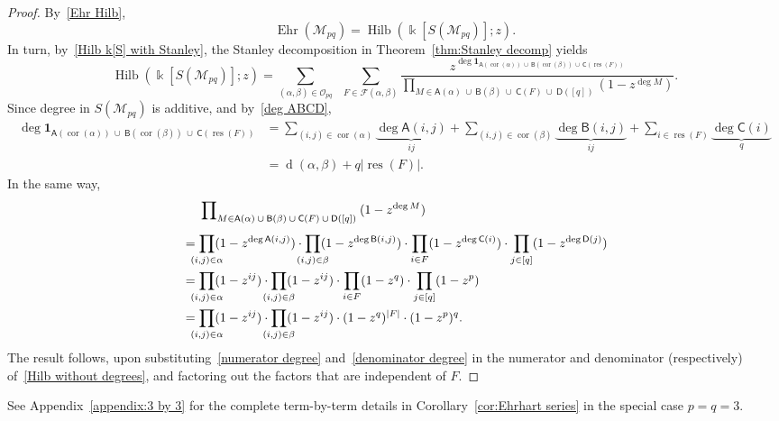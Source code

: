 \documentclass[noamsfonts,10pt]{amsart}
\newcommand{\M}{\mathcal{M}}
\newcommand{\al}{\alpha}
\newcommand{\be}{\beta}
\renewcommand{\O}{\mathcal{O}}
\newcommand{\F}{\mathcal{F}}
\renewcommand{\k}{\Bbbk}
\renewcommand{\d}{\operatorname{d}}
\DeclareMathOperator{\Ehr}{Ehr}
\DeclareMathOperator{\Hilb}{Hilb}
\newcommand{\res}{\operatorname{res}}
\DeclareMathOperator{\cor}{cor}
\newcommand{\sA}{\mathsf{A}}
\newcommand{\sB}{\mathsf{B}}
\newcommand{\sC}{\mathsf{C}}
\newcommand{\sD}{\mathsf{D}}
\newcommand{\1}{\mathbf{1}}
\theoremstyle{plain}
\theoremstyle{definition}
\numberwithin{equation}{section}
\begin{document}
\begin{proof}
    By~\eqref{Ehr Hilb},
    \[
        \Ehr(\M_{pq}) = \Hilb(\k[S(\M_{pq})];z).
    \]
    In turn, by~\eqref{Hilb k[S] with Stanley}, the Stanley decomposition in Theorem~\ref{thm:Stanley decomp} yields
    \begin{equation}
        \label{Hilb without degrees}
        \Hilb(\k[S(\M_{pq})];z) = \sum_{(\al, \be) \in \O_{pq}} \;\; \sum_{F \in \F(\al,\be)} \frac{z^{\deg \1_{\sA(\cor(\al)) \: \cup \: \sB(\cor(\be)) \: \cup \: \sC(\res(F))}}}{\prod_{M \in \sA(\al) \: \cup \: \sB(\be) \: \cup \: \sC(F) \: \cup \: \sD([q])} (1-z^{\deg M})}.
    \end{equation}
    Since degree in $S(\M_{pq})$ is additive, and by~\eqref{deg ABCD},
    \begin{align}
        \deg \1_{\sA(\cor(\al)) \: \cup \: \sB(\cor(\be)) \: \cup \: \sC(\res(F))} &= \sum_{(i,j) \in \cor(\al)} \underbrace{\deg \sA(i,j)}_{ij} + \sum_{(i,j) \in \cor(\be)} \underbrace{\deg \sB(i,j)}_{ij} + \sum_{i \in \res(F)} \underbrace{\deg \sC(i)}_{q} \nonumber \\
        & = \d(\al, \be) + q \left| \res(F) \right|. \label{numerator degree}
    \end{align}
In the same way,
    \begin{align}
        & \phantom{{} = {}}  \prod\nolimits_{M \in \sA(\al) \: \cup \: \sB(\be) \: \cup \: \sC(F) \: \cup \: \sD([q])} \: (1-z^{\deg M}) \nonumber \\[1ex]
        &= \prod_{\mathclap{(i,j) \in \al}} (1-z^{\deg \sA(i,j)}) \cdot \prod_{\mathclap{(i,j) \in \be}} (1-z^{\deg \sB(i,j)}) \cdot \prod_{i \in F} (1-z^{\deg \sC(i)}) \cdot \prod_{j \in [q]} (1-z^{\deg \sD(j)}) \nonumber \\
        & = \prod_{\mathclap{(i,j) \in \al}} (1-z^{ij}) \cdot \prod_{\mathclap{(i,j) \in \be}} (1-z^{ij}) \cdot \prod_{i \in F} (1-z^{q}) \cdot \prod_{j \in [q]} (1-z^{p}) \nonumber \\
        &= \prod_{\mathclap{(i,j) \in \al}} (1-z^{ij}) \cdot \prod_{\mathclap{(i,j) \in \be}} (1-z^{ij}) \cdot (1-z^{q})^{|F|} \cdot (1-z^{p})^q. \label{denominator degree}
    \end{align}
The result follows, upon substituting~\eqref{numerator degree} and~\eqref{denominator degree} in the numerator and denominator (respectively) of~\eqref{Hilb without degrees}, and factoring out the factors that are independent of $F$.
\end{proof}

See Appendix~\ref{appendix:3 by 3} for the complete term-by-term details in Corollary~\ref{cor:Ehrhart series} in the special case $p=q=3$.
\end{document}
